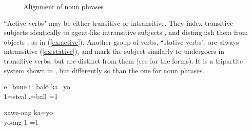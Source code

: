\begin{figure}
	\caption{Alignment of noun phrases}
	\label{fig:intro_alignment1}
\end{figure}

``Active verbs" may be either transitive or intransitive. They index transitive subjects  identically to agent-like intransitive subjects , and distinguish them from objects , as in (\ref{ex:active}). Another group of verbs, ``stative verbs", are always intransitive (\ref{ex:stative}), and mark the subject  similarly to undergoers in transitive verbs, but are distinct from them (see  for the forms). %
It is a tripartite system shown in , but differently so than the one for noun phrases.


	\ea
	\label{ex:active}
	\gll e=bune i=balô ka=yo\\
	 1=steal .=ball =1\\
	\glt {}
	\z
	
	
	\ea\label{ex:stative}
	
	\gll xawe-ong ka=yo\\
	 young-1 =1\\
	\glt {}
		\z

